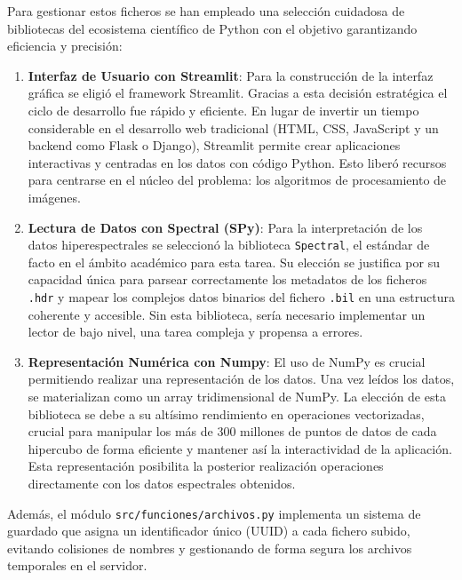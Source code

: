 Para gestionar estos ficheros se han empleado una selección cuidadosa de bibliotecas del ecosistema científico de Python con el objetivo garantizando eficiencia y precisión:

\begin{enumerate}
    \item \textbf{Interfaz de Usuario con Streamlit}: Para la construcción de la interfaz gráfica se eligió el framework Streamlit. Gracias a esta decisión estratégica el ciclo de desarrollo fue rápido y eficiente. En lugar de invertir un tiempo considerable en el desarrollo web tradicional (HTML, CSS, JavaScript y un backend como Flask o Django), Streamlit permite crear aplicaciones interactivas y centradas en los datos con código Python. Esto liberó recursos para centrarse en el núcleo del problema: los algoritmos de procesamiento de imágenes.

    \item \textbf{Lectura de Datos con Spectral (SPy)}: Para la interpretación de los datos hiperespectrales se seleccionó la biblioteca \verb|Spectral|, el estándar de facto en el ámbito académico para esta tarea. Su elección se justifica por su capacidad única para parsear correctamente los metadatos de los ficheros \verb|.hdr| y mapear los complejos datos binarios del fichero \verb|.bil| en una estructura coherente y accesible. Sin esta biblioteca, sería necesario implementar un lector de bajo nivel, una tarea compleja y propensa a errores.

    \item \textbf{Representación Numérica con Numpy}: El uso de NumPy es crucial permitiendo realizar una representación de los datos. Una vez leídos los datos, se materializan como un array tridimensional de NumPy. La elección de esta biblioteca se debe a su altísimo rendimiento en operaciones vectorizadas, crucial para manipular los más de 300 millones de puntos de datos de cada hipercubo de forma eficiente y mantener así la interactividad de la aplicación. Esta representación posibilita  la posterior realización operaciones directamente con los datos espectrales obtenidos.

\end{enumerate}

Además, el módulo \verb|src/funciones/archivos.py| implementa un sistema de guardado que asigna un identificador único (UUID) a cada fichero subido, evitando colisiones de nombres y gestionando de forma segura los archivos temporales en el servidor.



